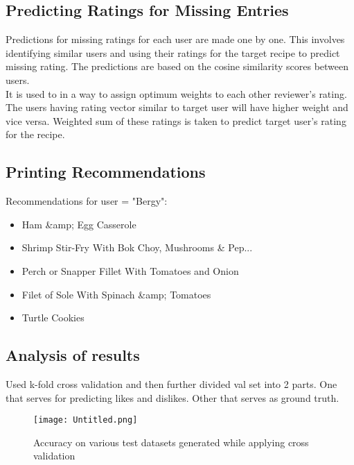 \documentclass[conference]{IEEEtran}
\begin{document}
\subsection{Predicting Ratings for Missing Entries}

Predictions for missing ratings for each user are made one by one. This involves identifying similar users and using their ratings for the target recipe to predict missing rating. The predictions are based on the cosine similarity scores between users. 
\\
It is used to in a way to assign optimum weights to each other reviewer's rating. The users having rating vector similar to target user will have higher weight and vice versa. Weighted sum of these ratings is taken to predict target user's rating for the recipe.

\subsection{Printing Recommendations}
Recommendations for user = "Bergy":
\begin{itemize}
    \item Ham \&amp; Egg Casserole
    \item Shrimp Stir-Fry With Bok Choy, Mushrooms \& Pep...
    \item Perch or Snapper Fillet With Tomatoes and Onion
    \item Filet of Sole With Spinach \&amp; Tomatoes
    \item Turtle Cookies
\end{itemize}

\subsection{Analysis of results}
Used k-fold cross validation and then further divided val set into 2 parts. One that serves for predicting likes and dislikes. Other that serves as ground truth.\\

\begin{figure}[H]
\centering
\texttt{[image: Untitled.png]}
\caption{Accuracy on various test datasets generated while applying cross validation}
\label{fig:Untitled}
\end{figure}
\end{document}
